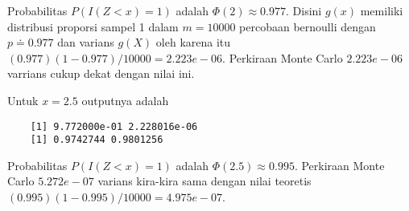 \documentclass[a4paper,12pt]{article}
\theoremstyle{definition}
\begin{document}
Probabilitas $P(I(Z < x)= 1)$ adalah $\Phi (2)\approx 0.977$. Disini $g(x)$ memiliki distribusi proporsi sampel 1 dalam $m= 10000$ percobaan bernoulli dengan $p\doteq 0.977$ dan varians $g(X)$ oleh karena itu $(0.977)(1-0.977)/10000= 2.223e-06$. Perkiraan Monte Carlo $2.223e-06$ varrians cukup dekat dengan nilai ini.

Untuk $x= 2.5$ outputnya adalah

\begin{lstlisting}
    [1] 9.772000e-01 2.228016e-06
    [1] 0.9742744 0.9801256
\end{lstlisting}

Probabilitas $P(I(Z < x)= 1)$ adalah $\Phi (2.5)\approx 0.995$. Perkiraan Monte Carlo $5.272e-07$ varians kira-kira sama dengan nilai teoretis $(0.995)(1-0.995)/10000= 4.975e-07$.
\end{document}
